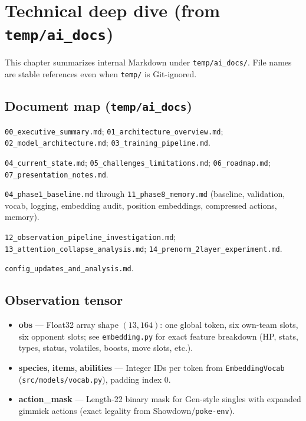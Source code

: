 \chapter{Technical deep dive (from \texttt{temp/ai\_docs})}

This chapter summarizes internal Markdown under \texttt{temp/ai\_docs/}. File names are stable references even when \texttt{temp/} is Git-ignored.

\section{Document map (\texttt{temp/ai\_docs})}
\footnotesize
\begin{description}[style=nextline,leftmargin=0cm,itemsep=0.15em]
  \item[Core overview] \texttt{00\_executive\_summary.md}; \texttt{01\_architecture\_overview.md}; \texttt{02\_model\_architecture.md}; \texttt{03\_training\_pipeline.md}.
  \item[Status / challenges] \texttt{04\_current\_state.md}; \texttt{05\_challenges\_limitations.md}; \texttt{06\_roadmap.md}; \texttt{07\_presentation\_notes.md}.
  \item[Phased experiments] \texttt{04\_phase1\_baseline.md} through \texttt{11\_phase8\_memory.md} (baseline, validation, vocab, logging, embedding audit, position embeddings, compressed actions, memory).
  \item[Deep dives] \texttt{12\_observation\_pipeline\_investigation.md}; \texttt{13\_attention\_collapse\_analysis.md}; \texttt{14\_prenorm\_2layer\_experiment.md}.
  \item[Config log] \texttt{config\_updates\_and\_analysis.md}.
\end{description}
\normalsize

\section{Observation tensor}
\begin{itemize}
  \item \textbf{obs} --- Float32 array shape $(13,164)$: one global token, six own-team slots, six opponent slots; see \texttt{embedding.py} for exact feature breakdown (HP, stats, types, status, volatiles, boosts, move slots, etc.).
  \item \textbf{species}, \textbf{items}, \textbf{abilities} --- Integer IDs per token from \texttt{EmbeddingVocab} (\texttt{src/models/vocab.py}), padding index 0.
  \item \textbf{action\_mask} --- Length-22 binary mask for Gen-style singles with expanded gimmick actions (exact legality from Showdown/\texttt{poke-env}).
\end{itemize}

